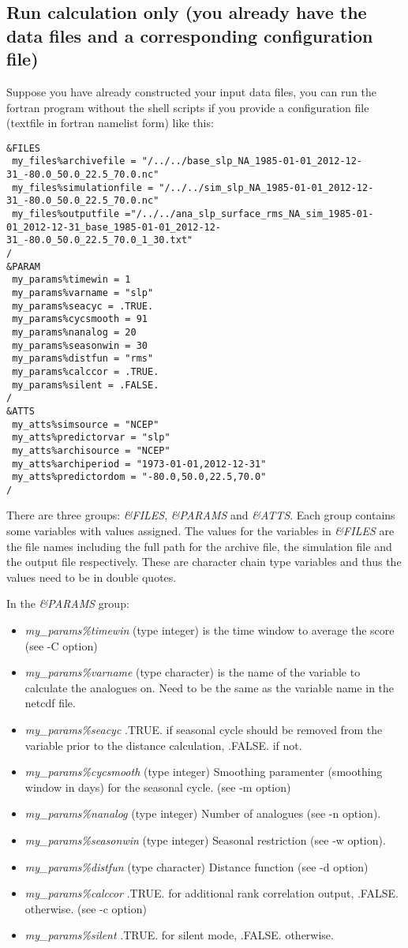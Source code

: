 \documentclass[11p,a4paper]{article}
\begin{document}
\subsection{Run calculation only (you already have the data files and a corresponding configuration file)}
Suppose you have already constructed your input data files, you can run the fortran program without the shell scripts if you provide a configuration file (textfile in fortran namelist form) like this:
\begin{verbatim}
&FILES
 my_files%archivefile = "/../../base_slp_NA_1985-01-01_2012-12-31_-80.0_50.0_22.5_70.0.nc"
 my_files%simulationfile = "/../../sim_slp_NA_1985-01-01_2012-12-31_-80.0_50.0_22.5_70.0.nc"
 my_files%outputfile ="/../../ana_slp_surface_rms_NA_sim_1985-01-01_2012-12-31_base_1985-01-01_2012-12-31_-80.0_50.0_22.5_70.0_1_30.txt"
/
&PARAM
 my_params%timewin = 1
 my_params%varname = "slp"
 my_params%seacyc = .TRUE.
 my_params%cycsmooth = 91
 my_params%nanalog = 20
 my_params%seasonwin = 30
 my_params%distfun = "rms"
 my_params%calccor = .TRUE.
 my_params%silent = .FALSE.
/
&ATTS
 my_atts%simsource = "NCEP"
 my_atts%predictorvar = "slp"
 my_atts%archisource = "NCEP"
 my_atts%archiperiod = "1973-01-01,2012-12-31"
 my_atts%predictordom = "-80.0,50.0,22.5,70.0"
/
\end{verbatim}
There are three groups: \textit{\&FILES}, \textit{\&PARAMS} and \textit{\&ATTS}. Each group contains some variables with values assigned. The values for the variables in \textit{\&FILES} are the file names including the full path for the archive file, the simulation file and the output file respectively. These are character chain type variables and thus the values need to be in double quotes.

In the \textit{\&PARAMS} group:
\begin{itemize}
 \item \textit{my\_params\%timewin} (type integer) is the time window to average the score (see -C option)
 \item \textit{my\_params\%varname} (type character) is the name of the  variable  to calculate the analogues on. Need to be the same as the variable name in the netcdf file.
 \item \textit{my\_params\%seacyc} .TRUE. if seasonal cycle should be removed from the variable prior to the distance calculation, .FALSE. if not.
 \item \textit{my\_params\%cycsmooth} (type integer) Smoothing paramenter (smoothing window in days) for the seasonal cycle. (see -m option)
 \item \textit{my\_params\%nanalog} (type integer) Number of analogues (see -n option).
 \item \textit{my\_params\%seasonwin} (type integer) Seasonal restriction (see -w option).
 \item \textit{my\_params\%distfun} (type character) Distance function (see -d option)
 \item \textit{my\_params\%calccor} .TRUE. for additional rank correlation output, .FALSE. otherwise. (see -c option)
 \item \textit{my\_params\%silent} .TRUE. for silent mode, .FALSE. otherwise.
\end{itemize}
\end{document}
